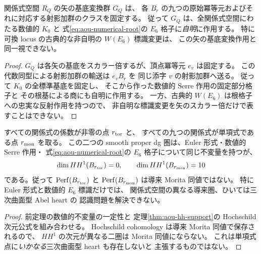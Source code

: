 \begin{proposition}
\label{prop:aou-numerical-trivial-torus}
関係式空間 $R_Q$ の矢の基底変換群 $G_Q$ は、
各 $B_r$ の九つの原始冪等元およびそれに対応する射影加群のクラスを固定する。
従って $G_Q$ は、全関係式空間にわたる数値的 $K_0$ と
式\eqref{eq:aou-numerical-root}の $E_6$ 格子に\emph{自明}に作用する。
特に可換 locus の古典的な非自明の $W(E_6)$ 標識変更は、
この矢の基底変換作用と同一視できない。
\end{proposition}
\begin{proof}
$G_Q$ は各矢の基底をスカラー倍するが、頂点冪等元 $e_v$ は固定する。
この代数同型による射影加群の輸送は $e_vB_r$ を
同じ添字 $v$ の射影加群へ送る。
従って $K_0$ の全標準基底を固定し、
そこから作った数値的 Serre 作用の固定部分格子と
その根基による商にも自明に作用する。
一方、古典的 $W(E_6)$ は根格子への忠実な反射作用を持つので、
非自明な標識変更を矢のスカラー倍だけで表すことはできない。
\end{proof}

\begin{corollary}[数値的不変量が区別できない境界]
\label{cor:aou-numerical-not-enough}
すべての関係式の係数が非零の点 $r_{\rm tor}$ と、
すべての九つの関係式が単項式である点 $r_{\rm mon}$ を取る。
この二つの smooth proper dg 圏は、Euler 形式・数値的 Serre 作用・
式\eqref{eq:aou-numerical-root}の $E_6$ 格子について同じ不変量を持つが、
\[
 \dim HH^1(B_{r_{\rm tor}})=0,\qquad
 \dim HH^1(B_{r_{\rm mon}})=10
\]
である。従って $\operatorname{Perf}(B_{r_{\rm tor}})$ と
$\operatorname{Perf}(B_{r_{\rm mon}})$ は導来 Morita 同値ではない。
特に Euler 形式と数値的 $E_6$ 標識だけでは、
関係式空間の異なる導来圏、ひいては三次曲面型 Abel heart の
認識問題を解決できない。
\end{corollary}
\begin{proof}
前定理の数値的不変量の一定性と
定理\ref{thm:aou-hh-support}の Hochschild 次元公式を組み合わせる。
Hochschild cohomology は導来 Morita 同値で保存されるので、
$HH^1$ の次元が異なる二圏は Morita 同値にならない。
これは単項式点に\emph{いかなる}三次曲面型 heart も存在しないと
主張するものではない。
\end{proof}


